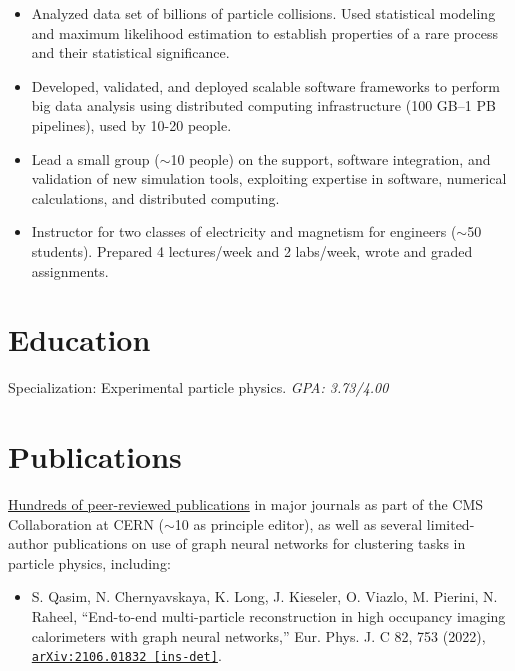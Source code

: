 \documentclass[9pt,a4paper]{moderncv}
\begin{document}
{
\begin{itemize}
    \item Analyzed data set of billions of particle collisions. Used statistical modeling and maximum likelihood estimation to establish properties of a rare process and their statistical significance.
    \item Developed, validated, and deployed scalable software frameworks to perform big data analysis using
distributed computing infrastructure (100 GB--1 PB pipelines), used by 10-20 people.
    \item Lead a small group ($\sim$10 people) on the support, software integration, and validation of new simulation tools, exploiting expertise in software, numerical calculations, and distributed computing.
    \item Instructor for two classes of electricity and magnetism for engineers ($\sim$50 students). Prepared 4 lectures/week and 2 labs/week, wrote and graded assignments.
\end{itemize}
}
\section{Education}
{
    Specialization: Experimental particle physics.
    \normalsize \textit{GPA: 3.73/4.00} 
}

\pagebreak
\section{Publications}
\href{https://inspirehep.net/authors/1280606}{Hundreds of peer-reviewed publications} in major journals as part of the CMS Collaboration at CERN ($\sim$10 as principle editor), as well as several limited-author publications on use of graph neural networks for clustering tasks in particle physics, including:
\begin{itemize}
    \item S. Qasim, N. Chernyavskaya, K. Long, J. Kieseler, O. Viazlo, M. Pierini, N. Raheel, ``End-to-end multi-particle reconstruction in high occupancy imaging calorimeters with graph neural networks,'' Eur. Phys. J. C 82, 753 (2022), \href{https://arxiv.org/abs/2106.01832}{\texttt{arXiv:2106.01832 [ins-det]}}.
\end{itemize}
\end{document}

